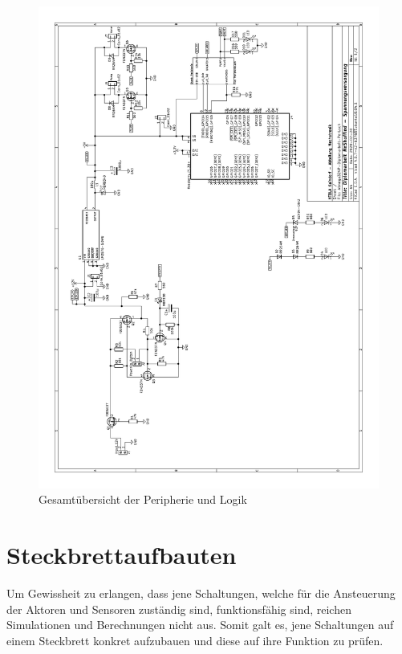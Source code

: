 \begin{figure}
    \includegraphics[scale=0.85,page=2]{fig/elektro/Schaltplan.pdf}
    \caption{Gesamtübersicht der Peripherie und Logik}
\end{figure}


\newpage
\section{Steckbrettaufbauten}

Um Gewissheit zu erlangen, dass jene Schaltungen, welche für die Ansteuerung der Aktoren und Sensoren zuständig sind, funktionsfähig sind, reichen Simulationen und Berechnungen nicht aus.
Somit galt es, jene Schaltungen auf einem Steckbrett konkret aufzubauen und diese auf ihre Funktion zu prüfen. \\

